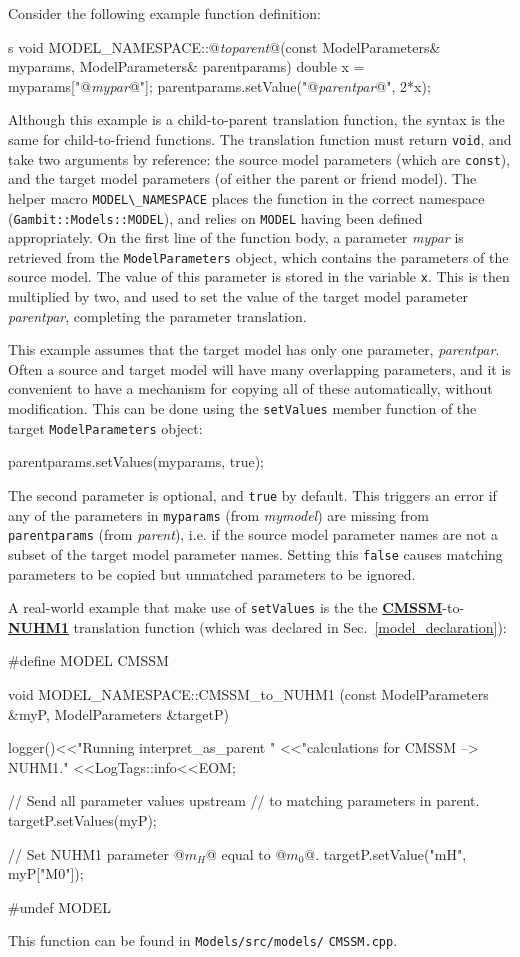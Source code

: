 \documentclass[pdftex,twocolumn,epjc3_preprint,runningheads]{svjour3}
\makeatletter
\renewcommand{\_}{\discretionary{\underscore}{}{\underscore}}
\newcommand\cpp[1]{{\lstinline!#1!}}  %
\newcommand\cpppragma[1]{{\CPPcommentstyle#1}}
\newcommand\term[1]{{\lstset{style=terminal}\lstinline!#1!\lstset{style=cpp}}}
\newcommand\CPPcommentstyle{\color{solarized@violet}\footnotesize\ttfamily}
\newcommand{\doublecrosssf}[2]{\hyperref[#2]{\textbf{\textsf{#1}}}}
\newcommand{\metavarf}[1]{\textit{\color{darkgreen}\footnotesize\textrm{#1}}}
\newcommand{\metavar}{\metavarf}
\makeatother
\begin{document}
Consider the following example function definition:
\begin{lstcpp}s
void MODEL_NAMESPACE::@\metavar{to\_parent}@(const
 ModelParameters& myparams, ModelParameters&
 parentparams)
{
  double x = myparams["@\metavar{my\_par}@"];
  parentparams.setValue("@\metavar{parent\_par}@", 2*x);
}
\end{lstcpp}
Although this example is a child-to-parent translation function, the syntax is the same for child-to-friend functions.  The translation function must return \mbox{\cpp{void},} and take two arguments by reference: the source model parameters (which are \cpp{const}), and the target model parameters (of either the parent or friend model). The helper macro \cpp{MODEL\_NAMESPACE} places the function in the correct namespace (\cpp{Gambit::Models::MODEL}), and relies on \cpp{MODEL} having been defined appropriately.  On the first line of the function body, a parameter \metavar{my\_par} is retrieved from the \cpp{ModelParameters} object, which contains the parameters of the source model.  The value of this parameter is stored in the variable \cpp{x}. This is then multiplied by two, and used to set the value of the target model parameter \metavar{parent\_par}, completing the parameter translation.

This example assumes that the target model has only one parameter, \metavar{parent\_par}.  Often a source and target model will have many overlapping parameters, and it is convenient to have a mechanism for copying all of these automatically, without modification. This can be done using the \cpp{setValues} member function of the target \cpp{ModelParameters} object:
\begin{lstcpp}
parentparams.setValues(myparams, true);
\end{lstcpp}
The second parameter is optional, and \cpp{true} by default.  This triggers an error if any of the parameters in \cpp{myparams} (from \metavar{my\_model}) are missing from \cpp{parentparams} (from \metavar{parent}), i.e. if the source model parameter names are not a subset of the target model parameter names. Setting this \cpp{false} causes matching parameters to be copied but unmatched parameters to be ignored.

A real-world example that make use of \cpp{setValues} is the the \doublecrosssf{CMSSM}{CMSSM}-to-\doublecrosssf{NUHM1}{NUHM1} translation function (which was declared in Sec.\ \ref{model_declaration}):
\begin{lstcpp}
#define MODEL CMSSM

  void MODEL_NAMESPACE::CMSSM_to_NUHM1
   (const ModelParameters &myP,
    ModelParameters &targetP)
  {
     logger()<<"Running interpret_as_parent "
             <<"calculations for CMSSM --> NUHM1."
             <<LogTags::info<<EOM;

     // Send all parameter values upstream
     // to matching parameters in parent.
     targetP.setValues(myP);

     // Set NUHM1 parameter @\cpppragma{$m_H$}@ equal to @\cpppragma{$m_0$}@.
     targetP.setValue("mH", myP["M0"]);
  }

#undef MODEL
\end{lstcpp}
This function can be found in \term{Models/src/models/} \term{CMSSM.cpp}.
\end{document}
